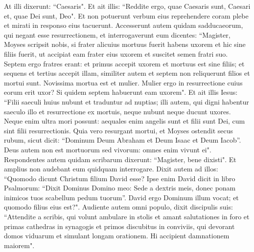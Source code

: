\begin{biblechapter}
\verse At illi dixerunt: “Caesaris". Et ait illis: “Reddite ergo, quae Caesaris sunt, Caesari et, quae Dei sunt, Deo". 
\verse Et non potuerunt verbum eius reprehendere coram plebe et mirati in responso eius tacuerunt. 
\verse Accesserunt autem quidam sadducaeorum, qui negant esse resurrectionem, et interrogaverunt eum 
\verse dicentes: “Magister, Moyses scripsit nobis, si frater alicuius mortuus fuerit habens uxorem et hic sine filiis fuerit, ut accipiat eam frater eius uxorem et suscitet semen fratri suo. 
\verse Septem ergo fratres erant: et primus accepit uxorem et mortuus est sine filiis; 
\verse et sequens 
\verse et tertius accepit illam, similiter autem et septem non reliquerunt filios et mortui sunt. 
\verse Novissima mortua est et mulier. 
\verse Mulier ergo in resurrectione cuius eorum erit uxor? Si quidem septem habuerunt eam uxorem". 
\verse Et ait illis Iesus: “Filii saeculi huius nubunt et traduntur ad nuptias; 
\verse illi autem, qui digni habentur saeculo illo et resurrectione ex mortuis, neque nubunt neque ducunt uxores. 
\verse Neque enim ultra mori possunt: aequales enim angelis sunt et filii sunt Dei, cum sint filii resurrectionis. 
\verse Quia vero resurgant mortui, et Moyses ostendit secus rubum, sicut dicit: “Dominum Deum Abraham et Deum Isaac et Deum Iacob”. 
\verse Deus autem non est mortuorum sed vivorum: omnes enim vivunt ei". 
\verse Respondentes autem quidam scribarum dixerunt: “Magister, bene dixisti". 
\verse Et amplius non audebant eum quidquam interrogare. 
\verse Dixit autem ad illos: “Quomodo dicunt Christum filium David esse? 
\verse Ipse enim David dicit in libro Psalmorum: “Dixit Dominus Domino meo: Sede a dextris meis, 
\verse donec ponam inimicos tuos scabellum pedum tuorum”. 
\verse David ergo Dominum illum vocat; et quomodo filius eius est?". 
\verse Audiente autem omni populo, dixit discipulis suis: 
\verse “Attendite a scribis, qui volunt ambulare in stolis et amant salutationes in foro et primas cathedras in synagogis et primos discubitus in conviviis, 
\verse qui devorant domos viduarum et simulant longam orationem. Hi accipient damnationem maiorem". 
\end{biblechapter}

